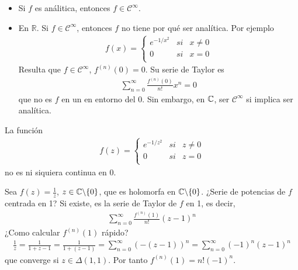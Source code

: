 \begin{obs}
    \begin{itemize}
        \item Si $f$ es análitica, entonces $f \in \mathcal{C}^{\infty}$.
        \item En $\mathbb{R}$. Si $f \in \mathcal{C}^{\infty}$, entonces $f$ no tiene por qué ser analítica. Por ejemplo
              \begin{align*}
                  f(x) = \left\{ \begin{array}{lcc}
                                     e^{-1/x^2} & si & x \not = 0 \\
                                     0          & si & x = 0      \\
                                 \end{array}
                  \right.
              \end{align*}
              Resulta que $f \in \mathcal{C}^{\infty}$, $f^{(n)}(0) = 0$. Su serie de Taylor es
              \begin{align*}
                  \sum_{n=0}^{\infty}{\frac{f^{(n)}(0)}{n!}x^n = 0}
              \end{align*}
              que no es $f$ en un en entorno del 0. Sin embargo, en $\mathbb{C}$, ser $\mathcal{C}^{\infty}$ si implica ser analítica.
    \end{itemize}
\end{obs}

\begin{obs}
    La función
    \begin{align*}
        f(z) = \left\{ \begin{array}{lcc}
                           e^{-1/z^2} & si & z \not = 0 \\
                           0          & si & z = 0      \\
                       \end{array}
        \right.
    \end{align*}
    no es ni siquiera continua en 0.
\end{obs}

\begin{ejemplo}
    Sea $f(z) = \frac{1}{z}$, $z \in \mathbb{C} \backslash \{0\}$, que es holomorfa en $\mathbb{C} \backslash \{0\}$. ¿Serie de potencias de $f$ centrada en 1? Si existe, es la serie de Taylor de $f$ en 1, es decir,
    \begin{align*}
        \sum_{n=0}^{\infty}{\frac{f^{(n)}(1)}{n!}(z-1)^n}
    \end{align*}
    ¿Como calcular $f^{(n)}(1)$ rápido?
    \begin{align*}
        \frac{1}{z} = \frac{1}{1+z-1} = \frac{1}{1+(z-1)} = \sum_{n=0}^{\infty}{(-(z-1))^n} = \sum_{n=0}^{\infty}{(-1)^n(z-1)^n}
    \end{align*}
    que converge si $z \in \Delta(1,1)$. Por tanto $f^{(n)}(1) = n!(-1)^n$.
\end{ejemplo}

